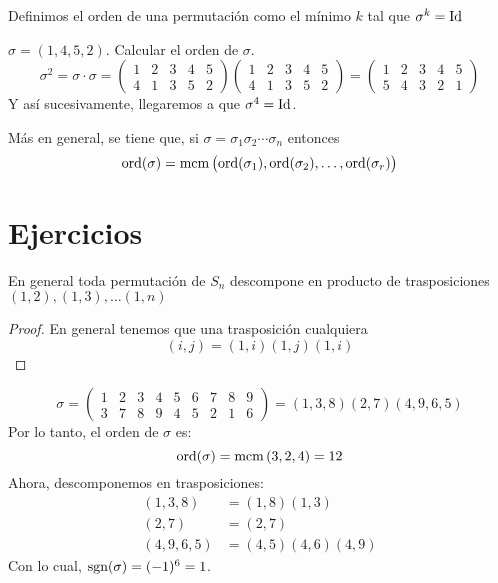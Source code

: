 \begin{defi}
    Definimos el orden de una permutación como el mínimo $k$ tal que $\sigma^k = \operatorname{Id}$
\end{defi}

\begin{example}
    $\sigma = (1, 4, 5, 2)$. Calcular el orden de $\sigma$.
    \[
        \sigma^2 = \sigma \cdot \sigma =
        \begin{pmatrix}
            1 & 2 & 3 & 4 & 5 \\
            4 & 1 & 3 & 5 &2
        \end{pmatrix}
        \begin{pmatrix}
            1 & 2 & 3 & 4 & 5 \\
            4 & 1 & 3 & 5 & 2
        \end{pmatrix} = 
        \begin{pmatrix}
            1 & 2 & 3 & 4 & 5 \\
            5 & 4 & 3 & 2 & 1
        \end{pmatrix}
    \]
    Y así sucesivamente, llegaremos a que $\sigma^4 = \operatorname{Id}$.
\end{example}

Más en general, se tiene que, si $\sigma = \sigma_1 \sigma_2 \cdots \sigma_n$ entonces
\[
    \operatorname{ord}(\sigma) = \operatorname{mcm} \left( \operatorname{ord} (\sigma_1), \operatorname{ord}(\sigma_2), \dots, \operatorname{ord}(\sigma_r) \right)
\]

\section{Ejercicios}

\begin{ej} %
    En general toda permutación de $S_n$ descompone en producto de trasposiciones
    $(1, 2), (1, 3), \dots (1, n)$
\end{ej}

\begin{proof}
    En general tenemos que una trasposición cualquiera
    \[
        (i, j) = (1, i)(1, j)(1,i)
    \]
\end{proof}

\begin{ej}
    \[
        \sigma =
        \begin{pmatrix}
            1 & 2 & 3 & 4 & 5 & 6 & 7 & 8 & 9 \\
            3 & 7 & 8 & 9 & 4 & 5 & 2 & 1 & 6
        \end{pmatrix}
        = (1, 3, 8) (2, 7) (4, 9, 6, 5)
    \]
    Por lo tanto, el orden de $\sigma$ es:
    \[
        \operatorname{ord}(\sigma) = \operatorname{mcm}\left( 3, 2, 4 \right) = 12
    \]
    Ahora, descomponemos en trasposiciones:
    \[
        \begin{aligned}
            (1, 3, 8) &= (1, 8) (1, 3) \\
            (2, 7) &= (2, 7) \\
            (4, 9, 6, 5) &= (4, 5) (4, 6) (4, 9)
        \end{aligned}
    \]
    Con lo cual, $\text{sgn}(\sigma) = (-1)^6 = 1$.
\end{ej}

